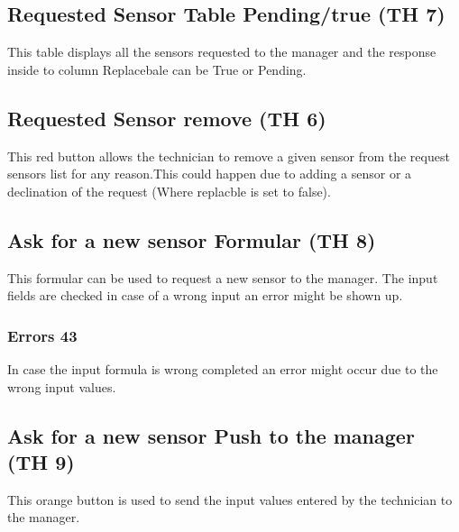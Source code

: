 \subsection{Requested Sensor Table Pending/true (TH 7)}
This table displays all the sensors requested to the manager and the response
inside to column Replacebale can be True or Pending.

\subsection{Requested Sensor remove (TH 6)}
This red button allows the technician to remove a given sensor from the request
sensors list for any reason.This could happen due to adding a sensor or a
declination of the request (Where replacble is set to false).

\subsection{Ask for a new sensor Formular (TH 8)}
This formular can be used to request a new sensor to the manager.
The input fields are checked in case of a wrong input an error might be
shown up.

\subsubsection{Errors 43}
In case the input formula is wrong completed an error might occur due to the
wrong input values.

\subsection{Ask for a new sensor Push to the manager (TH 9)}
This orange button is used to send the input values entered by the technician
to the manager.



